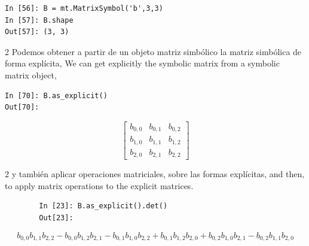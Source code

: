 \begin{center}
	\begin{minipage}{.3\textwidth}
		\begin{verbatim}
In [56]: B = mt.MatrixSymbol('b',3,3)
In [57]: B.shape
Out[57]: (3, 3)				
		\end{verbatim}
	\end{minipage}
\end{center}
\begin{paracol}{2}
Podemos obtener a partir de un objeto matriz simbólico la matriz simbólica de forma explícita,
\switchcolumn
We can get explicitly the symbolic matrix from a symbolic matrix object,
\end{paracol}
\begin{center}
	\begin{minipage}{.3\textwidth}
\begin{verbatim}
In [70]: B.as_explicit()
Out[70]:				
\end{verbatim}
\[
\begin{bmatrix}
b_{0, 0} & b_{0, 1} & b_{0, 2}\\
b_{1, 0} & b_{1, 1} & b_{1, 2}\\
b_{2, 0} & b_{2, 1} & b_{2, 2}
\end{bmatrix}
\]
	\end{minipage}
\end{center}
\begin{paracol}{2}
y también aplicar operaciones matriciales, sobre las formas explícitas,
\switchcolumn
and then, to apply matrix operations to the explicit matrices.
\end{paracol}
\begin{center}
\begin{minipage}{.8\textwidth}
	\begin{verbatim}
		In [23]: B.as_explicit().det()
		Out[23]:			
	\end{verbatim}
\end{minipage}
\end{center}
\[
b_{0, 0} b_{1, 1} b_{2, 2} - b_{0, 0} b_{1, 2} b_{2, 1} - b_{0, 1} b_{1, 0} b_{2, 2} + b_{0, 1} b_{1, 2} b_{2, 0} + b_{0, 2} b_{1, 0} b_{2, 1} - b_{0, 2} b_{1, 1} b_{2, 0}
\]

